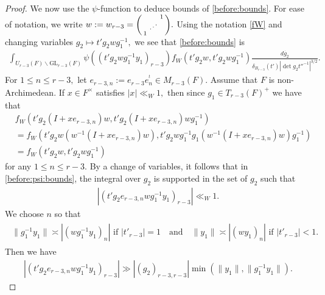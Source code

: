 \documentclass[12pt]{amsart}
\theoremstyle{remark}
\numberwithin{equation}{section}
\newcommand{\GL}{\mathrm{GL}}
\theoremstyle{definition}
\newenvironment{psmatrix}
  {\left(\begin{smallmatrix}}
  {\end{smallmatrix}\right)}
\numberwithin{equation}{subsection}
\newcommand{\norm}[1]{\lVert#1\rVert}
\begin{document}
\begin{proof}
We now use the $\psi$-function to deduce bounds of \eqref{before:bounds}.  For ease of notation, we write $w:=w_{r-3}=\begin{psmatrix} & & 1 \\ & \textrm{\reflectbox{$\ddots$}} & \\ 1 & & \end{psmatrix}.$ Using the notation \eqref{fW} and changing variables $g_2\mapsto t'g_2wg_1^{-1},$ we see that \eqref{before:bounds} is 
\begin{align} \label{before:psi:bounds}
\int_{U_{r-3}(F) \backslash \GL_{r-3}(F) }\psi((t'g_2wg_1^{-1}y_1)_{r-3})f_{W}(t'g_2w,t'g_2wg_1^{-1})\frac{d\dot{g_2}}{\delta_{B_{r-3}}(t')|\det g_2t''^{-1}|^{3/2}}.
\end{align}
For $1\le n\le r-3,$ let $e_{r-3,n}:=e_{r-3}e_n^{^t}\in M_{r-3}(F).$ Assume that $F$ is non-Archimedean.
If $x \in F^\times$ 
 satisfies $
    |x| \ll_{W} 1,$ then since $g_1 \in T_{r-3}(F)^+$ we have
that
\begin{align*}
&f_{W}(t'g_2(I+xe_{r-3,n})w,t'g_2(I+xe_{r-3,n})wg_1^{-1})\\&=f_{W}(t'g_2w(w^{-1}(I+xe_{r-3,n})w),t'g_2wg_1^{-1} g_1(w^{-1}(I+xe_{r-3,n})w)g_1^{-1})\\
&=f_W(t'g_2w,t'g_2wg_1^{-1})
\end{align*}
for any $1 \leq n\leq r-3.$
By a change of variables, it follows that in \eqref{before:psi:bounds}, the integral over $g_2$ is supported in 
 the set of $g_2$ such that 
\begin{align*}
 |(t'g_2e_{r-3,n} wg^{-1}_1y_1)_{r-3}|\ll_{W}  1.
\end{align*}
We choose $n$ so that 
\begin{align} \label{choose:n} \begin{split}
\norm{g_1^{-1}y_1} \asymp |(wg_1^{-1}y_1)_{n}| \textrm{ if } |t'_{r-3}| = 1 \quad\textrm{and}\quad
\norm{y_1} \asymp |(wy_1)_{n}| \textrm{ if } |t'_{r-3}| < 1. \end{split}
\end{align}
Then we have 
\begin{align}\label{eq:choosenresult}
 |(t'g_2e_{r-3,n} wg^{-1}_1y_1)_{r-3}| \gg |(g_2)_{r-3,r-3}|\min(\norm{y_1},\norm{g_1^{-1}y_1}).
\end{align}


\end{proof}
\end{document}
